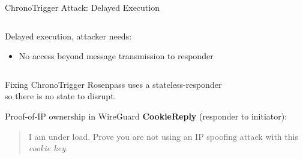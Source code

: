 \begin{frame}{ChronoTrigger Attack: Delayed Execution}
\begin{columns}[fullwidth,T]
\begin{column}{.46\linewidth}
{        \begin{block}{Delayed execution, attacker needs:}
          \begin{itemize}
            \item No access beyond message transmission to responder
          \end{itemize}
          \unskip
        \end{block}

        }

    \end{column}
  \end{columns}
\end{frame}

\begin{frame}{Fixing ChronoTrigger}
  \centering
  Rosenpass uses a stateless-responder
  \\[1.3em] so there is no state to disrupt.
\end{frame}


\begin{frame}{Proof-of-IP ownership in WireGuard}
  \textbf{CookieReply} (responder to initiator):
  \\[1.3em]\blockquote{I am under load. Prove you are not using an IP spoofing attack with this \emph{cookie key}.}
\end{frame}

